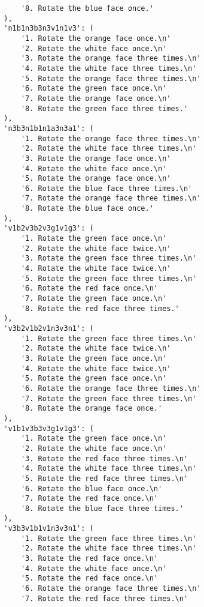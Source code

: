 \begin{lstlisting}
            '8. Rotate the blue face once.'
        ),
        'n1b1n3b3n3v1n1v3': (
            '1. Rotate the orange face once.\n'
            '2. Rotate the white face once.\n'
            '3. Rotate the orange face three times.\n'
            '4. Rotate the white face three times.\n'
            '5. Rotate the orange face three times.\n'
            '6. Rotate the green face once.\n'
            '7. Rotate the orange face once.\n'
            '8. Rotate the green face three times.'
        ),
        'n3b3n1b1n1a3n3a1': (
            '1. Rotate the orange face three times.\n'
            '2. Rotate the white face three times.\n'
            '3. Rotate the orange face once.\n'
            '4. Rotate the white face once.\n'
            '5. Rotate the orange face once.\n'
            '6. Rotate the blue face three times.\n'
            '7. Rotate the orange face three times.\n'
            '8. Rotate the blue face once.'
        ),
        'v1b2v3b2v3g1v1g3': (
            '1. Rotate the green face once.\n'
            '2. Rotate the white face twice.\n'
            '3. Rotate the green face three times.\n'
            '4. Rotate the white face twice.\n'
            '5. Rotate the green face three times.\n'
            '6. Rotate the red face once.\n'
            '7. Rotate the green face once.\n'
            '8. Rotate the red face three times.'
        ),
        'v3b2v1b2v1n3v3n1': (
            '1. Rotate the green face three times.\n'
            '2. Rotate the white face twice.\n'
            '3. Rotate the green face once.\n'
            '4. Rotate the white face twice.\n'
            '5. Rotate the green face once.\n'
            '6. Rotate the orange face three times.\n'
            '7. Rotate the green face three times.\n'
            '8. Rotate the orange face once.'
        ),
        'v1b1v3b3v3g1v1g3': (
            '1. Rotate the green face once.\n'
            '2. Rotate the white face once.\n'
            '3. Rotate the red face three times.\n'
            '4. Rotate the white face three times.\n'
            '5. Rotate the red face three times.\n'
            '6. Rotate the blue face once.\n'
            '7. Rotate the red face once.\n'
            '8. Rotate the blue face three times.'
        ),
        'v3b3v1b1v1n3v3n1': (
            '1. Rotate the green face three times.\n'
            '2. Rotate the white face three times.\n'
            '3. Rotate the red face once.\n'
            '4. Rotate the white face once.\n'
            '5. Rotate the red face once.\n'
            '6. Rotate the orange face three times.\n'
            '7. Rotate the red face three times.\n'

\end{lstlisting}
